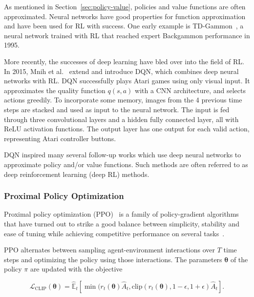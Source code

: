 As mentioned in Section~\ref{sec:policy-value}, policies and value functions are often approximated.
Neural networks have good properties for function approximation and have been used for RL with success.
One early example is TD-Gammon~\cite{tesauro1995tdgammon}, a neural network trained with RL that reached expert Backgammon performance in 1995.

More recently, the successes of deep learning have bled over into the field of RL.
In 2015, Mnih et al.~\cite{mnih_human_2015} extend \cite{mnih_atari_2013} and introduce DQN, which combines deep neural networks with RL.
DQN successfully plays Atari games using only visual input.
It approximates the quality function \(q(s, a)\) with a CNN architecture, and selects actions greedily.
To incorporate some memory, images from the 4 previous time steps are stacked and used as input to the neural network.
The input is fed through three convolutional layers and a hidden fully connected layer, all with ReLU activation functions.
The output layer has one output for each valid action, representing Atari controller buttons.

DQN inspired many several follow-up works which use deep neural networks to approximate policy and/or value functions.
Such methods are often referred to as deep reinforcement learning (deep RL) methods.

\subsubsection{Proximal Policy Optimization}
\label{sec:ppo}

Proximal policy optimization (PPO)~\cite{schulman_ppo_2017} is a family of policy-gradient algorithms that have turned out to strike a good balance between simplicity, stability and ease of tuning while achieving competitive performance on several tasks~\cite{schulman_ppo_2017,henderson_matters_2018,cobbe_procgen_2020,vinyals_alphastar_2019,andrychowicz_empirical_2020}.

PPO alternates between sampling agent-environment interactions over \(T\) time steps and optimizing the policy using those interactions.
The parameters \(\boldsymbol{\theta}\) of the policy \(\pi\) are updated with the objective

\[
    \mathcal{L}_\text{CLIP}(\boldsymbol{\theta}) = 
    \hat{\mathbb{E}}_t \left\lbrack \min(r_t(\boldsymbol{\theta}) \hat{A}_t, \text{clip}(r_t(\boldsymbol{\theta}),1-\epsilon, 1+\epsilon) \hat{A}_t \right\rbrack.
\]

